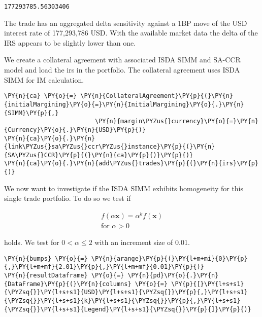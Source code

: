             \begin{tcolorbox}[breakable, size=fbox, boxrule=.5pt, pad at break*=1mm, opacityfill=0]
\begin{Verbatim}[commandchars=\\\{\}]
177293785.56303406
\end{Verbatim}
\end{tcolorbox}
        
    The trade has an aggregated delta sensitivity against a 1BP move of the
USD interest rate of 177,293,786 USD. With the available market data the
delta of the IRS appears to be slightly lower than one.

    
    We create a collateral agreement with associated \gls{ISDA SIMM} and \gls{SA-CCR}
model and load the irs in the portfolio. The collateral agreement uses
ISDA SIMM for IM calculation.

    \begin{tcolorbox}[breakable, size=fbox, boxrule=1pt, pad at break*=1mm,colback=cellbackground, colframe=cellborder]
\begin{Verbatim}[commandchars=\\\{\}]
\PY{n}{ca} \PY{o}{=} \PY{n}{CollateralAgreement}\PY{p}{(}\PY{n}{initialMargining}\PY{o}{=}\PY{n}{InitialMargining}\PY{o}{.}\PY{n}{SIMM}\PY{p}{,}
                         \PY{n}{margin\PYZus{}currency}\PY{o}{=}\PY{n}{Currency}\PY{o}{.}\PY{n}{USD}\PY{p}{)}
\PY{n}{ca}\PY{o}{.}\PY{n}{link\PYZus{}sa\PYZus{}ccr\PYZus{}instance}\PY{p}{(}\PY{n}{SA\PYZus{}CCR}\PY{p}{(}\PY{n}{ca}\PY{p}{)}\PY{p}{)}
\PY{n}{ca}\PY{o}{.}\PY{n}{add\PYZus{}trades}\PY{p}{(}\PY{n}{irs}\PY{p}{)}
\end{Verbatim}
\end{tcolorbox}

    We now want to investigate if the ISDA SIMM exhibits homogeneity for
this single trade portfolio. To do so we test if

\begin{align*}
f\left(\alpha \mathbf{x}\right) = \alpha^k f\left(\mathbf{x}\right) \\
        \text{for } \alpha >0
\end{align*}

holds. We test for \(0<\alpha\leq 2\) with an increment size of 0.01.

    \begin{tcolorbox}[breakable, size=fbox, boxrule=1pt, pad at break*=1mm,colback=cellbackground, colframe=cellborder]
\begin{Verbatim}[commandchars=\\\{\}]
\PY{n}{bumps} \PY{o}{=} \PY{n}{arange}\PY{p}{(}\PY{l+m+mi}{0}\PY{p}{,}\PY{l+m+mf}{2.01}\PY{p}{,}\PY{l+m+mf}{0.01}\PY{p}{)}
\PY{n}{resultDataframe} \PY{o}{=} \PY{n}{pd}\PY{o}{.}\PY{n}{DataFrame}\PY{p}{(}\PY{n}{columns} \PY{o}{=} \PY{p}{[}\PY{l+s+s1}{\PYZsq{}}\PY{l+s+s1}{USD}\PY{l+s+s1}{\PYZsq{}}\PY{p}{,}\PY{l+s+s1}{\PYZsq{}}\PY{l+s+s1}{k}\PY{l+s+s1}{\PYZsq{}}\PY{p}{,}\PY{l+s+s1}{\PYZsq{}}\PY{l+s+s1}{Legend}\PY{l+s+s1}{\PYZsq{}}\PY{p}{]}\PY{p}{)}
\end{Verbatim}
\end{tcolorbox}

